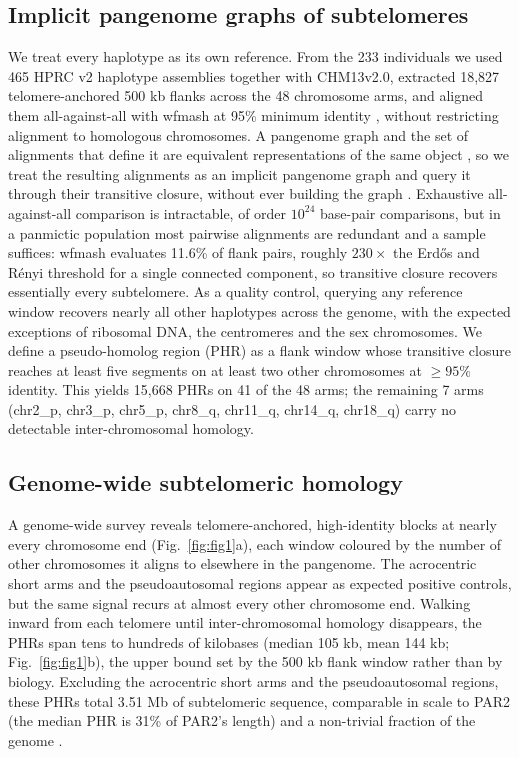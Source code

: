 \documentclass[pdflatex,mathphys]{jnl}
\begin{document}
\subsection*{Implicit pangenome graphs of subtelomeres}

We treat every haplotype as its own reference.
From the 233 individuals we used 465 HPRC v2 haplotype assemblies together with
CHM13v2.0, extracted 18,827 telomere-anchored 500 kb flanks across the 48
chromosome arms, and aligned them all-against-all with wfmash at 95\% minimum
identity \cite{Guarracino2023}, without restricting alignment to homologous
chromosomes.
A pangenome graph and the set of alignments that define it are equivalent
representations of the same object \cite{Garrison2024pggb}, so we treat the
resulting alignments as an implicit pangenome graph and query it through their
transitive closure, without ever building the graph
\cite{pangenome_graphs_impg_GarrisonGuarracino2023,pangenome_graphs_impg_IMPG2023}.
Exhaustive all-against-all comparison is intractable, of order $10^{24}$
base-pair comparisons, but in a panmictic population most pairwise alignments
are redundant and a sample suffices: wfmash evaluates 11.6\% of flank pairs,
roughly $230\times$ the Erd\H{o}s and R\'{e}nyi threshold for a single connected
component, so transitive closure recovers essentially every subtelomere.
As a quality control, querying any reference window recovers nearly all other
haplotypes across the genome, with the expected exceptions of ribosomal DNA, the
centromeres and the sex chromosomes.
We define a pseudo-homolog region (PHR) as a flank window whose transitive
closure reaches at least five segments on at least two other chromosomes at
$\geq 95\%$ identity.
This yields 15,668 PHRs on 41 of the 48 arms; the remaining 7 arms (chr2\_p,
chr3\_p, chr5\_p, chr8\_q, chr11\_q, chr14\_q, chr18\_q) carry no detectable
inter-chromosomal homology.

\subsection*{Genome-wide subtelomeric homology}

A genome-wide survey reveals telomere-anchored, high-identity blocks at nearly
every chromosome end (Fig.~\ref{fig:fig1}a), each window coloured by the number
of other chromosomes it aligns to elsewhere in the pangenome.
The acrocentric short arms and the pseudoautosomal regions appear as expected
positive controls, but the same signal recurs at almost every other chromosome
end.
Walking inward from each telomere until inter-chromosomal homology disappears,
the PHRs span tens to hundreds of kilobases (median 105 kb, mean 144 kb;
Fig.~\ref{fig:fig1}b), the upper bound set by the 500 kb flank window rather
than by biology.
Excluding the acrocentric short arms and the pseudoautosomal regions, these PHRs
total 3.51 Mb of subtelomeric sequence, comparable in scale to PAR2 (the median
PHR is 31\% of PAR2's length) and a non-trivial fraction of the genome
\cite{sexchrompars_bellott2024}.
\end{document}
